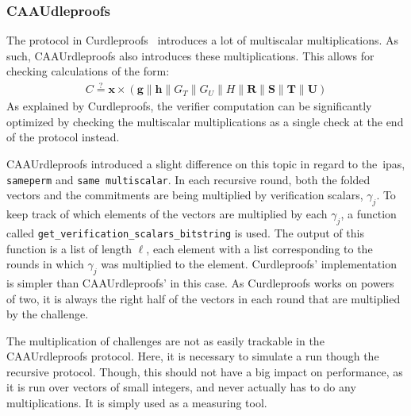 \subsubsection{CAAUdleproofs}
The protocol in Curdleproofs~\cite{Curdleproofs} introduces a lot of multiscalar multiplications.
As such, CAAUrdleproofs also introduces these multiplications.
This allows for checking calculations of the form:
\begin{align}
    C\stackrel{?}{=}\mathbf{x}\times(\mathbf{g}\|\mathbf{h}\|G_T\|G_U\|H\|\mathbf{R}\|\mathbf{S}\|\mathbf{T}\|\mathbf{U})
\end{align}
As explained by Curdleproofs, the verifier computation can be significantly optimized by checking the multiscalar multiplications as a single check at the end of the protocol instead.

CAAUrdleproofs introduced a slight difference on this topic in regard to the~\glspl{ipa}, \texttt{sameperm} and \texttt{same multiscalar}.
In each recursive round, both the folded vectors and the commitments are being multiplied by verification scalars, $\gamma_j$.
To keep track of which elements of the vectors are multiplied by each $\gamma_j$, a function called \texttt{get\_verification\_scalars\_bitstring} is used.
The output of this function is a list of length $\ell$, each element with a list corresponding to the rounds in which $\gamma_j$ was multiplied to the element.
Curdleproofs' implementation is simpler than CAAUrdleproofs' in this case.
As Curdleproofs works on powers of two, it is always the right half of the vectors in each round that are multiplied by the challenge.

The multiplication of challenges are not as easily trackable in the CAAUrdleproofs protocol.
Here, it is necessary to simulate a run though the recursive protocol.
Though, this should not have a big impact on performance, as it is run over vectors of small integers, and never actually has to do any multiplications.
It is simply used as a measuring tool.

